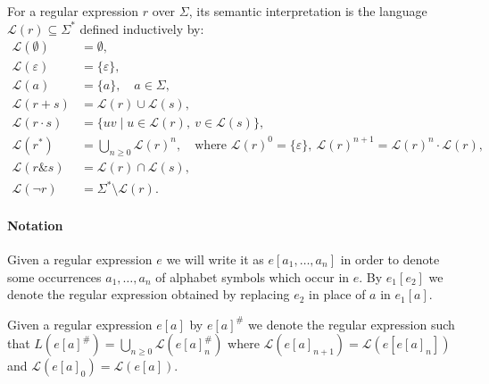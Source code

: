 \begin{definition}

For a regular expression $r$ over $\Sigma$, its semantic interpretation is the
language $\mathcal{L}(r) \subseteq \Sigma^*$ defined inductively by:
\[
\begin{aligned}
\mathcal{L}(\emptyset)   &= \emptyset, \\
\mathcal{L}(\varepsilon) &= \{\varepsilon\}, \\
\mathcal{L}(a)           &= \{a\}, \quad a \in \Sigma, \\[0.5ex]
\mathcal{L}(r + s)       &= \mathcal{L}(r) \cup \mathcal{L}(s), \\
\mathcal{L}(r \cdot s)   &= \{uv \mid u \in \mathcal{L}(r),\ v \in \mathcal{L}(s)\}, \\
\mathcal{L}(r^*)         &= \bigcup_{n \geq 0} \mathcal{L}(r)^n,
   \quad \text{where } \mathcal{L}(r)^0 = \{\varepsilon\},\
   \mathcal{L}(r)^{n+1} = \mathcal{L}(r)^n \cdot \mathcal{L}(r), \\
\mathcal{L}(r \& s)      &= \mathcal{L}(r) \cap \mathcal{L}(s), \\
\mathcal{L}(\neg r)      &= \Sigma^* \setminus \mathcal{L}(r).
\end{aligned}
\]
\end{definition}

{\color{red}\paragraph{Notation} Given a regular expression $e$ we will write it as $e[a_1,\ldots,a_n]$ in order to denote some occurrences $a_1,\ldots,a_n$ of alphabet symbols which occur in $e$. By $e_1[e_2]$ we denote the regular expression obtained by replacing $e_2$ in place of $a$ in $e_1[a]$.
\begin{definition} 
Given a regular expression $e[a]$ by $e[a]^\#$ we denote the regular expression such that $L(e[a]^\#)= \bigcup_{n \geq 0} \mathcal{L}(e[a]^\#_n)$ 
   where $ \mathcal L(e[a]_{n+1})=\mathcal L(e[e[a]_n])${ and }$\mathcal{L}(e[a]_0)=  \mathcal L(e[a]).$
\end{definition}}





